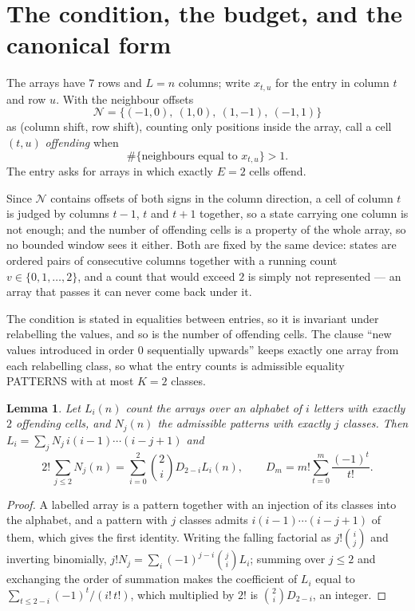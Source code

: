 \documentclass[11pt,a4paper]{article}
\theoremstyle{plain}
\newtheorem{lemma}[theorem]{Lemma}
\theoremstyle{definition}
\begin{document}
\section{The condition, the budget, and the canonical form}

The arrays have $7$ rows and $L=n$ columns; write $x_{t,u}$ for the entry in
column $t$ and row $u$. With the neighbour offsets
\[
\mathcal N=\{(-1,0),\ (1,0),\ (1,-1),\ (-1,1)\}
\]
as (column shift, row shift), counting only positions inside the array, call a cell
$(t,u)$ \emph{offending} when
\[
\#\{\text{neighbours equal to }x_{t,u}\}>1 .
\]
The entry asks for arrays in which exactly $E=2$ cells offend.

Since $\mathcal N$ contains offsets of both signs in the column direction, a cell of column
$t$ is judged by columns $t-1$, $t$ and $t+1$ together, so a state carrying one column is not
enough; and the number of offending cells is a property of the whole array, so no bounded
window sees it either. Both are fixed by the same device: states are ordered pairs of
consecutive columns together with a running count $v\in\{0,1,\dots,2\}$, and a count that
would exceed $2$ is simply not represented --- an array that passes it can never come back
under it.

The condition is stated in equalities between entries, so it is invariant under relabelling
the values, and so is the number of offending cells. The clause ``new values introduced in
order $0$ sequentially upwards'' keeps exactly one array from each relabelling class, so what
the entry counts is admissible equality PATTERNS with at most $K=2$ classes.

\begin{lemma}\label{lem:inv}
Let $L_i(n)$ count the arrays over an alphabet of $i$ letters with exactly $2$ offending
cells, and $N_j(n)$ the admissible patterns with exactly $j$ classes. Then
$L_i=\sum_j N_j\,i(i-1)\cdots(i-j+1)$ and
\[
2!\,\sum_{j\le2}N_j(n)=\sum_{i=0}^{2}\binom{2}{i}D_{2-i}L_i(n),
\qquad D_m=m!\sum_{t=0}^{m}\frac{(-1)^t}{t!} .
\]
\end{lemma}

\begin{proof}
A labelled array is a pattern together with an injection of its classes into the alphabet,
and a pattern with $j$ classes admits $i(i-1)\cdots(i-j+1)$ of them, which gives the first
identity. Writing the falling factorial as $j!\binom{i}{j}$ and inverting binomially,
$j!N_j=\sum_i(-1)^{j-i}\binom{j}{i}L_i$; summing over $j\le2$ and exchanging the
order of summation makes the coefficient of $L_i$ equal to
$\sum_{t\le2-i}(-1)^t/(i!\,t!)$, which multiplied by $2!$ is
$\binom{2}{i}D_{2-i}$, an integer.
\end{proof}
\end{document}
